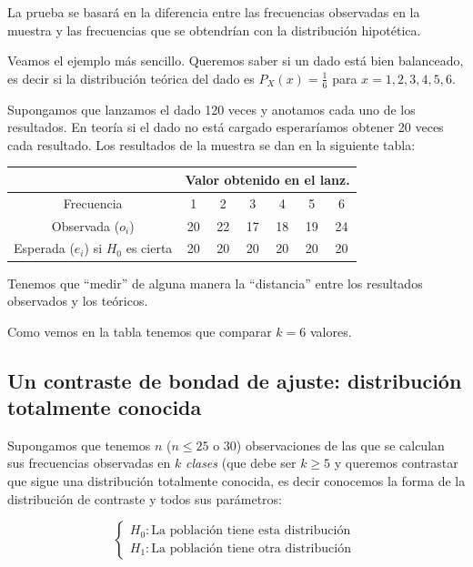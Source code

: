 \documentclass[12pt]{report}
\begin{document}
       La prueba se basará en la diferencia entre las frecuencias
       observadas en la muestra y las frecuencias que se obtendrían
       con la distribución hipotética.

       Veamos el ejemplo más sencillo. Queremos saber si un dado está
       bien balanceado, es decir si la distribución teórica del dado
       es $P_{X}(x)=\frac{1}{6}$ para $x=1,2,3,4,5,6$.

       Supongamos que lanzamos el dado 120 veces y anotamos cada uno
       de los resultados. En teoría si el dado no está cargado
       esperaríamos obtener 20 veces cada resultado. Los resultados de
       la muestra se dan en la siguiente tabla:

       \begin{center}
       \begin{tabular}{|c||cccccc|}\cline{2-7}
     \multicolumn{1}{c}{} & \multicolumn{6}{|c|}{Valor obtenido en el lanz.}\\
           \hline
         Frecuencia   &1 & 2 & 3 & 4 & 5 & 6\\
           \hline
          Observada ($o_{i}$) & 20 & 22 & 17 & 18 & 19 & 24\\
          Esperada  ($e_{i}$) si $H_{0}$ es cierta& 20 & 20 & 20 & 20 & 20 & 20\\
           \hline
           \end{tabular}
       \end{center}
           Tenemos que ``medir'' de alguna manera la ``distancia''
           entre los resultados observados y los teóricos.

           Como vemos en la tabla tenemos que comparar $k= 6$ valores.

       \subsection{Un contraste de bondad de ajuste: distribución
           totalmente conocida}

           Supongamos que tenemos $n$ ($n\leq 25$ o $30$) observaciones de las que se calculan
           sus frecuencias observadas en $k$ \emph{clases} (que debe ser $k\geq 5$ y queremos
           contrastar que sigue una distribución totalmente conocida, es decir conocemos la forma de
           la distribución de contraste y todos sus parámetros:

           $$\left\{\begin{array}{l}
           H_{0}: \mbox{La población tiene esta distribución }\\
           H_{1}: \mbox{La población tiene otra distribución}
           \end{array}
           \right.
           $$
\end{document}
